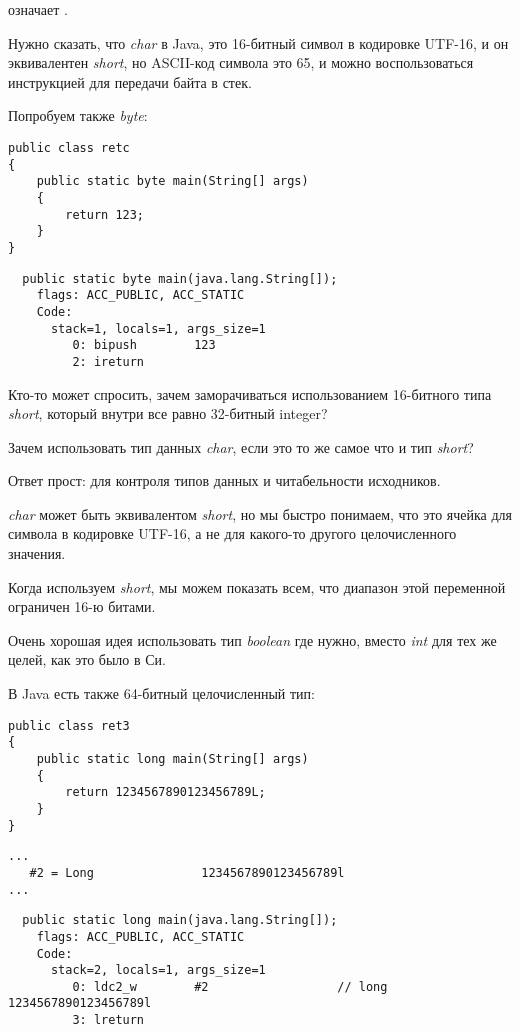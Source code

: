  означает .

Нужно сказать, что \emph{char} в Java, это 16-битный символ в кодировке UTF-16,
и он эквивалентен \emph{short}, но ASCII-код символа  это 65, и можно воспользоваться
инструкцией для передачи байта в стек.

Попробуем также \emph{byte}:

\begin{lstlisting}[style=customjava]
public class retc
{
	public static byte main(String[] args) 
	{
		return 123;
	}
}
\end{lstlisting}

\begin{lstlisting}
  public static byte main(java.lang.String[]);
    flags: ACC_PUBLIC, ACC_STATIC
    Code:
      stack=1, locals=1, args_size=1
         0: bipush        123
         2: ireturn       
\end{lstlisting}

Кто-то может спросить, зачем заморачиваться использованием 16-битного типа \emph{short}, который
внутри все равно 32-битный integer?

Зачем использовать тип данных \emph{char}, если это то же самое что и тип \emph{short}?

Ответ прост: для контроля типов данных и читабельности исходников.

\emph{char} может быть эквивалентом \emph{short}, но мы быстро понимаем, что это ячейка
для символа в кодировке UTF-16, а не для какого-то другого целочисленного значения.

Когда используем \emph{short}, мы можем показать всем, что диапазон этой переменной 
ограничен 16-ю битами.

Очень хорошая идея использовать тип \emph{boolean} где нужно, 
вместо \emph{int} для тех же целей, как это было в Си.

В Java есть также 64-битный целочисленный тип:

\begin{lstlisting}[style=customjava]
public class ret3
{
	public static long main(String[] args)
	{
		return 1234567890123456789L;
	}
}
\end{lstlisting}

\begin{lstlisting}[caption=Constant pool]
...
   #2 = Long               1234567890123456789l
...
\end{lstlisting}

\begin{lstlisting}
  public static long main(java.lang.String[]);
    flags: ACC_PUBLIC, ACC_STATIC
    Code:
      stack=2, locals=1, args_size=1
         0: ldc2_w        #2                  // long 1234567890123456789l
         3: lreturn       
\end{lstlisting}

